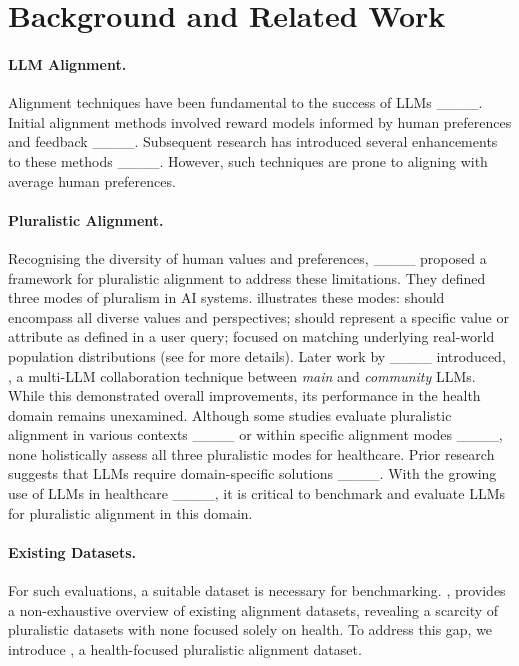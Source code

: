 \section{Background and Related Work}
\paragraph{LLM Alignment.} Alignment techniques have been fundamental to the success of LLMs ____. Initial alignment methods involved reward models informed by human preferences and feedback ____. Subsequent research has introduced several enhancements to these methods ____. However, such techniques are prone to aligning with average human preferences. 

\paragraph{Pluralistic Alignment.} Recognising the diversity of human values and preferences, ____ proposed a framework for pluralistic alignment to address these limitations. They defined three modes of pluralism in AI systems.  illustrates these modes: \overton should encompass all diverse values and perspectives; \steerable should represent a specific value or attribute as defined in a user query; \distributional focused on matching underlying real-world population distributions (see  for more details). Later work by ____ introduced, \modplural, a multi-LLM collaboration technique between \textit{main} and \textit{community} LLMs. While this demonstrated overall improvements, its performance in the health domain remains unexamined. Although some studies evaluate pluralistic alignment in various contexts ____ or within specific alignment modes ____, none holistically assess all three pluralistic modes for healthcare. Prior research suggests that LLMs require domain-specific solutions ____. With the growing use of LLMs in healthcare ____, it is critical to benchmark and evaluate LLMs for pluralistic alignment in this domain.



\paragraph{Existing Datasets.} For such evaluations, a suitable dataset is necessary for benchmarking. , provides a non-exhaustive overview of existing alignment datasets, revealing a scarcity of pluralistic datasets with none focused solely on health. To address this gap, we introduce \ourdataset, a health-focused pluralistic alignment  dataset.